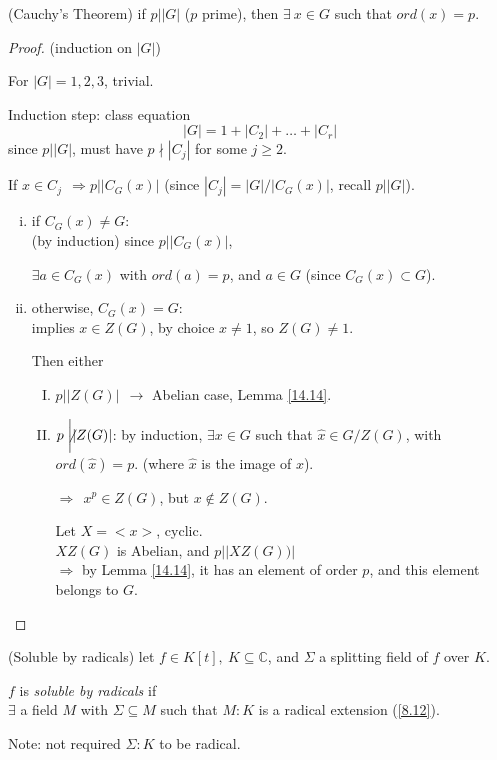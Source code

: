 \documentclass{article}
\theoremstyle{definition}
\newenvironment{defn}[1]
{\renewcommand\theinnerdefn{#1}\innerdefn}
{\endinnerdefn}
\newenvironment{thm}[1]
{\renewcommand\theinnerthm{#1}\innerthm}
{\endinnerthm}
\begin{document}
\begin{thm}{14.15}(Cauchy's Theorem)
  if $p \biggr\vert |G|$ ($p$ prime), then $\exists ~ x \in G$ such that $ord(x)=p$.
\end{thm}
\begin{proof}
  (induction on $|G|$)

  For $|G|=1,2,3$, trivial.

  Induction step: class equation
  $$|G|=1+|C_2|+ \ldots + |C_r|$$
  since $p \biggr\vert |G|$, must have $p \nmid |C_j|$ for some $j \geq 2$.

  If $x \in C_j ~~\Longrightarrow p \biggr\vert |C_G(x)|$ (since $|C_j|=|G|/|C_G(x)|$, recall $p\biggr\vert |G|$).

  \begin{enumerate}[i.]
    \item if $C_G(x) \neq G$:\\
      (by induction) since $p \biggr\vert |C_G(x)|$,

      $\exists a \in C_G(x)$ with $ord(a)=p$, and $a \in G$ (since $C_G(x) \subset G$).
    \item otherwise, $C_G(x)=G$:\\
      implies $x \in Z(G)$, by choice $x\neq 1$, so $Z(G)\neq 1$.

      Then either
      \begin{enumerate}[I.]
	\item $p \biggr\vert |Z(G)| ~~ \longrightarrow$ Abelian case, Lemma \ref{14.14}.
	\item $p \not\biggr\vert |Z(G)|$:
	  by induction, $\exists x \in G$ such that $\hat{x} \in G/Z(G)$, with $ord(\hat{x})=p$. (where $\hat{x}$ is the image of $x$).

	  $\Longrightarrow~~ x^p \in Z(G)$, but $x \not\in Z(G)$.

	  Let $X=<x>$, cyclic.\\
	  $XZ(G)$ is Abelian, and $p \biggr\vert |XZ(G))|$\\
	  $\Longrightarrow$ by Lemma \ref{14.14}, it has an element of order $p$, and this element belongs to $G$.
      \end{enumerate}

  \end{enumerate}
\end{proof}

\begin{defn}{15.1}(Soluble by radicals)
  let $f \in K[t],~ K \subseteq \mathbb{C}$, and $\Sigma$ a splitting field of $f$ over $K$.

  $f$ is \emph{soluble by radicals} if\\
  $\exists$ a field $M$ with $\Sigma \subseteq M$ such that $M:K$ is a radical extension (\ref{8.12}).

  Note: not required $\Sigma:K$ to be radical.
\end{defn}
\end{document}

